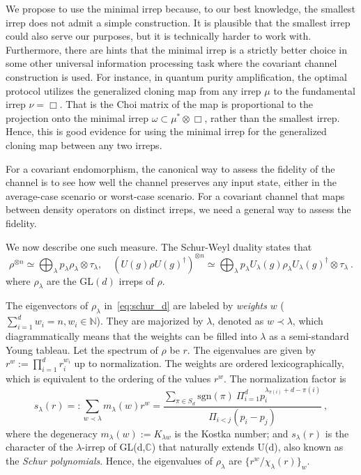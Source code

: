 \documentclass[11pt,letterpaper]{article}
\begin{document}
We propose to use the minimal irrep because, to our best knowledge, the smallest irrep does not admit a simple construction. It is plausible that the smallest irrep could also serve our purposes, but it is technically harder to work with. Furthermore, there are hints that the minimal irrep is a strictly better choice in some other universal information processing task where the covariant channel construction is used. For instance, in quantum purity amplification, the optimal protocol utilizes the generalized cloning map from any irrep $\mu$ to the fundamental irrep $\nu=\Box$. That is the Choi matrix of the map is proportional to the projection onto the minimal irrep $\omega\subset \mu^*\otimes\Box$, rather than the smallest irrep. Hence, this is good evidence for using the minimal irrep for the generalized cloning map between any two irreps. 

For a covariant endomorphism, the canonical way to assess the fidelity of the channel is to see how well the channel preserves any input state, either in the average-case scenario or worst-case scenario. For a covariant channel that maps between density operators on distinct irreps, we need a general way to assess the fidelity.

We now describe one such measure. The Schur-Weyl duality states that
\begin{equation}\label{eq:schur_d}
    \rho^{\otimes n}\simeq \bigoplus_\lambda p_\lambda \rho_\lambda \otimes \tau_\lambda,\quad (U(g)\rho U(g)^\dagger)^{\otimes n}\simeq \bigoplus_\lambda p_\lambda U_\lambda(g)\rho_\lambda U_\lambda(g)^\dagger \otimes \tau_\lambda\ .
\end{equation}
where $\rho_\lambda$ are the GL$(d)$ irreps of $\rho$. 

The eigenvectors of $\rho_\lambda$ in~\eqref{eq:schur_d} are labeled by \emph{weights} $w$ ($\sum_{i=1}^d w_i=n, w_i\in\mathbb{N}$). They are majorized by $\lambda$, denoted as $w\prec\lambda$, which diagrammatically means that the weights can be filled into $\lambda$ as a semi-standard Young tableau. Let the spectrum of $\rho$ be $r$. The eigenvalues are given by $r^w:=\prod_{i=1}^d r_i^{w_i}$ up to normalization. The weights are ordered lexicographically, which is equivalent to the ordering of the values $r^w$. The normalization factor is
\begin{equation}
    s_\lambda(r) =:\sum_{w \prec \lambda} m_{\lambda}(w)r^w = \frac{\sum_{\pi\in S_d} \mathrm{sgn}(\pi)\ \Pi_{i=1}^d p_i^{\lambda_{\pi(i)}+d-\pi(i)}}{\Pi_{i<j}(p_i-p_j)} \ ,
\end{equation}
where the degeneracy $m_{\lambda}(w):=K_{\lambda w}$ is the Kostka number; and $s_\lambda(r)$ is the character of the $\lambda$-irrep of GL(d,$\mathbb{C}$) that naturally extends U(d), also known as the \emph{Schur polynomials}. Hence, the eigenvalues of $\rho_\lambda$ are $\{r^w/\chi_\lambda(r)\}_w$. 
\end{document}
